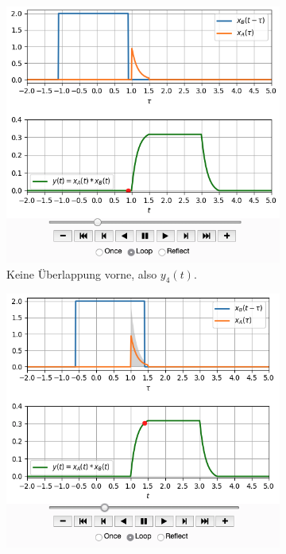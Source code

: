 \begin{figure}[h!]
\centering
\begin{subfigure}{0.45\textwidth}
\centering
\includegraphics[width=\textwidth]{../convolution_ct/conv_var2_4_AF3B15E0D3.png}
\caption{Keine Überlappung vorne, also $y_4(t)$.}
\label{fig:AF3B15E0D3_v2_4}
\end{subfigure}
\begin{subfigure}{0.45\textwidth}
\centering
\includegraphics[width=\textwidth]{../convolution_ct/conv_var2_1_AF3B15E0D3.png}

\end{subfigure}
\end{figure}
